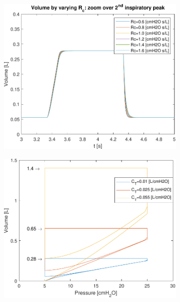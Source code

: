 \begin{figure}[t!]
	\begin{subfigure}{0.5\linewidth}
	\centering
	\includegraphics[width=0.95\linewidth]{../model/data_log/Rc_volume_zoom.pdf}
	\caption{}
\end{subfigure}\hfill
	\begin{subfigure}{0.5\linewidth}
	\centering
	\includegraphics[width=0.95\linewidth]{../model/data_log/CwCL_PV.pdf}
	\caption{}
\end{subfigure}\hfill
	\caption{}
\end{figure}

